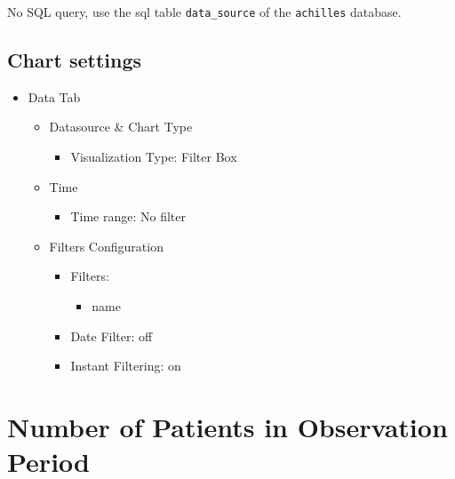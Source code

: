 \documentclass[
]{book}
\providecommand{\tightlist}{%
  \setlength{\itemsep}{0pt}\setlength{\parskip}{0pt}}
\begin{document}
No SQL query, use the sql table \texttt{data\_source} of the \texttt{achilles} database.

\hypertarget{chart-settings-12}{%
\subsection{Chart settings}\label{chart-settings-12}}

\begin{itemize}
\item
  Data Tab

  \begin{itemize}
  \item
    Datasource \& Chart Type

    \begin{itemize}
    \tightlist
    \item
      Visualization Type: Filter Box
    \end{itemize}
  \item
    Time

    \begin{itemize}
    \tightlist
    \item
      Time range: No filter
    \end{itemize}
  \item
    Filters Configuration

    \begin{itemize}
    \item
      Filters:

      \begin{itemize}
      \tightlist
      \item
        name
      \end{itemize}
    \item
      Date Filter: off
    \item
      Instant Filtering: on
    \end{itemize}
  \end{itemize}
\end{itemize}

\hypertarget{number-of-patients-in-observation-period}{%
\section{Number of Patients in Observation Period}\label{number-of-patients-in-observation-period}}
\end{document}
